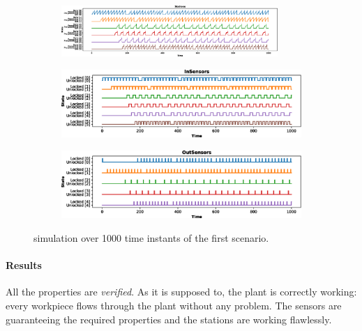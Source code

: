 \documentclass[a4paper]{article}
\begin{document}
    \begin{figure}[h!]
        \begin{subfigure}{\textwidth}
            \centering
            \includegraphics[width=0.9\textwidth]{images/scenarios/scenario1_stations}
        \end{subfigure}
        \begin{subfigure}{0.49\textwidth}
            \centering
            \includegraphics[width=\textwidth]{images/scenarios/scenario1_insensors}
        \end{subfigure}
        \hfill
        \begin{subfigure}{0.49\textwidth}
            \centering
            \includegraphics[width=\textwidth]{images/scenarios/scenario1_outsensors}
        \end{subfigure}
        \caption{simulation over 1000 time instants of the first scenario.}
        \label{figure:scenario:1}
    \end{figure}

    \paragraph{Results} All the properties are \textit{verified}. As it is supposed to, the plant is correctly working: every workpiece flows through the plant without any problem. The sensors are guaranteeing the required properties and the stations are working flawlessly.
\end{document}
